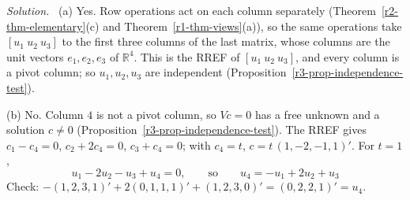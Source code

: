 \documentclass[12pt]{article}
\newcommand{\R}{\mathbb R}
\theoremstyle{definition}
\newenvironment{solution}{\par\noindent\textit{Solution.}\ }{\par\smallskip}
\begin{document}
\begin{solution}
(a) Yes. Row operations act on each column separately (Theorem~\ref{r2-thm-elementary}(c) and
Theorem~\ref{r1-thm-views}(a)), so the same operations take \([u_1\ u_2\ u_3]\) to the first three
columns of the last matrix, whose columns are the unit vectors \(e_1,e_2,e_3\) of \(\R^4\). This is
the RREF of \([u_1\ u_2\ u_3]\), and every column is a pivot column; so \(u_1,u_2,u_3\) are
independent (Proposition~\ref{r3-prop-independence-test}).

(b) No. Column \(4\) is not a pivot column, so \(Vc=0\) has a free unknown and a solution
\(c\ne0\) (Proposition~\ref{r3-prop-independence-test}). The RREF gives \(c_1-c_4=0\),
\(c_2+2c_4=0\), \(c_3+c_4=0\); with \(c_4=t\), \(c=t\,(1,-2,-1,1)'\). For \(t=1\),
\[
u_1-2u_2-u_3+u_4=0,\qquad\text{so}\qquad u_4=-u_1+2u_2+u_3
\]
Check: \(-(1,2,3,1)'+2(0,1,1,1)'+(1,2,3,0)'=(0,2,2,1)'=u_4\).
\end{solution}
\end{document}
